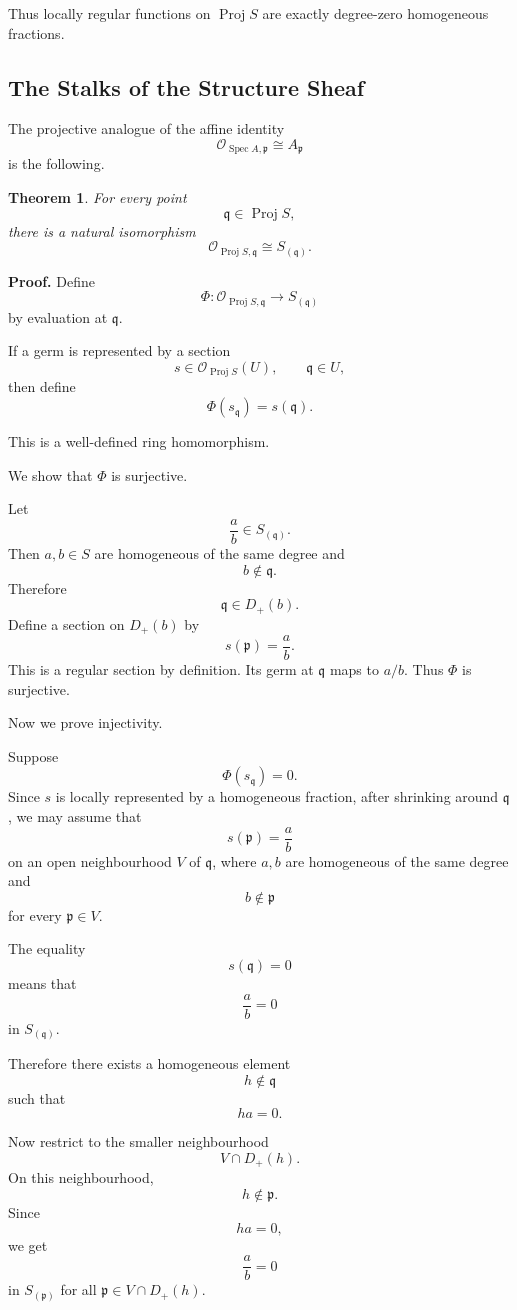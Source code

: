 \documentclass[12pt,a4paper]{article}
\DeclareMathOperator{\Spec}{Spec}
\DeclareMathOperator{\Proj}{Proj}
\newtheorem{theorem}{Theorem}[section]
\theoremstyle{notespace}
\begin{document}
Thus locally regular functions on \(\Proj S\) are exactly degree-zero homogeneous
fractions.

\subsection{The Stalks of the Structure Sheaf}

The projective analogue of the affine identity
\[
\mathcal O_{\Spec A,\mathfrak p}\cong A_{\mathfrak p}
\]
is the following.

\begin{theorem}
	For every point
	\[
	\mathfrak q\in \Proj S,
	\]
	there is a natural isomorphism
	\[
	\mathcal O_{\Proj S,\mathfrak q}
	\cong
	S_{(\mathfrak q)}.
	\]
\end{theorem}

\textbf{Proof.}
Define
\[
\Phi:\mathcal O_{\Proj S,\mathfrak q}\longrightarrow S_{(\mathfrak q)}
\]
by evaluation at \(\mathfrak q\).

If a germ is represented by a section
\[
s\in \mathcal O_{\Proj S}(U),
\qquad \mathfrak q\in U,
\]
then define
\[
\Phi(s_{\mathfrak q})=s(\mathfrak q).
\]

This is a well-defined ring homomorphism.

We show that \(\Phi\) is surjective.

Let
\[
\frac{a}{b}\in S_{(\mathfrak q)}.
\]
Then \(a,b\in S\) are homogeneous of the same degree and
\[
b\notin\mathfrak q.
\]
Therefore
\[
\mathfrak q\in D_+(b).
\]
Define a section on \(D_+(b)\) by
\[
s(\mathfrak p)=\frac{a}{b}.
\]
This is a regular section by definition. Its germ at \(\mathfrak q\) maps to \(a/b\).
Thus \(\Phi\) is surjective.

Now we prove injectivity.

Suppose
\[
\Phi(s_{\mathfrak q})=0.
\]
Since \(s\) is locally represented by a homogeneous fraction, after shrinking around
\(\mathfrak q\), we may assume that
\[
s(\mathfrak p)=\frac{a}{b}
\]
on an open neighbourhood \(V\) of \(\mathfrak q\), where \(a,b\) are homogeneous of the
same degree and
\[
b\notin\mathfrak p
\]
for every \(\mathfrak p\in V\).

The equality
\[
s(\mathfrak q)=0
\]
means that
\[
\frac{a}{b}=0
\]
in \(S_{(\mathfrak q)}\).

Therefore there exists a homogeneous element
\[
h\notin\mathfrak q
\]
such that
\[
ha=0.
\]

Now restrict to the smaller neighbourhood
\[
V\cap D_+(h).
\]
On this neighbourhood,
\[
h\notin\mathfrak p.
\]
Since
\[
ha=0,
\]
we get
\[
\frac{a}{b}=0
\]
in \(S_{(\mathfrak p)}\) for all \(\mathfrak p\in V\cap D_+(h)\).
\end{document}
